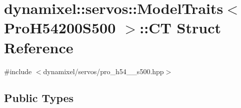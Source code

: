 \hypertarget{structdynamixel_1_1servos_1_1_model_traits_3_01_pro_h54200_s500_01_4_1_1_c_t}{}\section{dynamixel\+:\+:servos\+:\+:Model\+Traits$<$ Pro\+H54200\+S500 $>$\+:\+:C\+T Struct Reference}
\label{structdynamixel_1_1servos_1_1_model_traits_3_01_pro_h54200_s500_01_4_1_1_c_t}


{\ttfamily \#include $<$dynamixel/servos/pro\+\_\+h54\+\_\+\_\+s500.\+hpp$>$}

\subsection*{Public Types}
